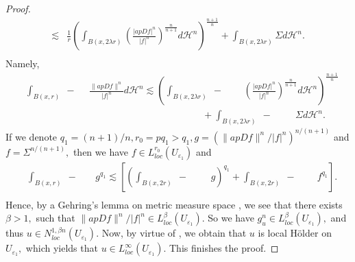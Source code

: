 \documentclass[11pt,twoside]{article}
\theoremstyle{definition}
\theoremstyle{remark}
\newcommand{\aleq}{\lesssim}
\begin{document}
\begin{proof}
\begin{equation}
\begin{aligned}
\aleq&\frac{1}{r}\left(\int_{B(x,2\lambda r)}\left(\frac{\vert apDf\vert^{n}}{\vert f\vert^{n}}\right)^{\frac{n}{n+1}}d\mathcal{H}^{n}\right)^{\frac{n+1}{n}}+
\int_{B(x,2\lambda r)}\Sigma d\mathcal{H}^{n}.\\
\end{aligned}
\end{equation}
Namely,
\begin{equation}\label{e14}
\begin{aligned}
&\int_{B(x,r)}\!\!\!\!\!\!\!\!\!\!\!\!\!\!\!\!\!\!\!\!\; {}-{} \,\,\,\,\,\,\,\,\frac{\|apDf\|^{n}}{\vert f\vert^{n}}d\mathcal{H}^{n}\aleq \left(\int_{B(x,2\lambda r)}\!\!\!\!\!\!\!\!\!\!\!\!\!\!\!\!\!\!\!\!\!\!\!\!\!\; {}-{} \,\,\,\,\,\,\,\,\,\,\,\;\left(\frac{\vert apDf\vert^{n}}{\vert f\vert^{n}}\right)^{\frac{n}{n+1}}d\mathcal{H}^{n}\right)^{\frac{n+1}{n}}\\
&\,\,\,\,\,\,\,\,\,\,\,\,\,\,\,\,\,\,\,\,\,\,\,\,\,\,\,\,\,\,\,\,\,\,\,\,\,\,\,\,\,\,\,\,\,\,\,\,\,\,\,\,\,\,\,\,\,\,\,\,\,\,\,\,\,\,\,\,\,\,\,\,\,\,\,\,\,\,\,\,\,\,\,\,\,\,\,\,\,\,\,\,\,\,\,\,\,\,\,
\,\,\,\,\,\,\,\,\,\,\,\,+
\int_{B(x,2\lambda r)}\!\!\!\!\!\!\!\!\!\!\!\!\!\!\!\!\!\!\!\!\!\!\!\!\!\; {}-{} \,\,\,\,\,\,\,\,\,\,\,\;\;\Sigma d\mathcal{H}^{n}.
\end{aligned}
\end{equation}
If we denote $q_{1}=(n+1)/n, r_{0}=pq_{1}>q_{1}, g=(\|apDf\|^{n}/\vert f\vert^{n})^{n/(n+1)}$ and $f=\Sigma^{n/(n+1)},$
then we have $f\in L_{loc}^{r_{0}}(U_{\varepsilon_{1}})$ and 
\begin{equation}
\begin{aligned}
&\int_{B(x,r)}\!\!\!\!\!\!\!\!\!\!\!\!\!\!\!\!\!\!\!\!\; {}-{} \,\,\,\,\,\,\,\,\,\,\,g^{q_{1}}\aleq\left[\left(\int_{B(x,2r)}\!\!\!\!\!\!\!\!\!\!\!\!\!\!\!\!\!\!\!\!\!\!\!\; {}-{} \,\,\,\,\,\,\,\,\,\,\,\,\,\,g\right)^{q_{1}}+
\int_{B(x,2r)}\!\!\!\!\!\!\!\!\!\!\!\!\!\!\!\!\!\!\!\!\!\!\!\; {}-{} \,\,\,\,\,\,\,\,\,\,\,\,\,f^{q_{1}}\right].\\
\end{aligned}
\end{equation}
Hence, by a Gehring's lemma on metric measure space \cite[Theorem 3.3]{Gol05}, we see that   there exists $\beta>1,$ such that $\|apDf\|^{n}/\vert f\vert^{n}\in L_{loc}^{\beta}(U_{\varepsilon_{1}}).$  So we have $g_{u}^{n}\in L_{loc}^{\beta}(U_{\varepsilon_{1}}),$ and thus $u\in N_{loc}^{1,\beta n}(U_{\varepsilon_{1}}).$ Now, by virtue of \cite[Theorem 5.1]{HK00}, we obtain that $u$ is local H\"{o}lder on $U_{\varepsilon_{1}},$ which yields that $u\in L_{loc}^{\infty}(U_{\varepsilon_{1}}).$ This finishes the proof.


\end{proof}
\end{document}
